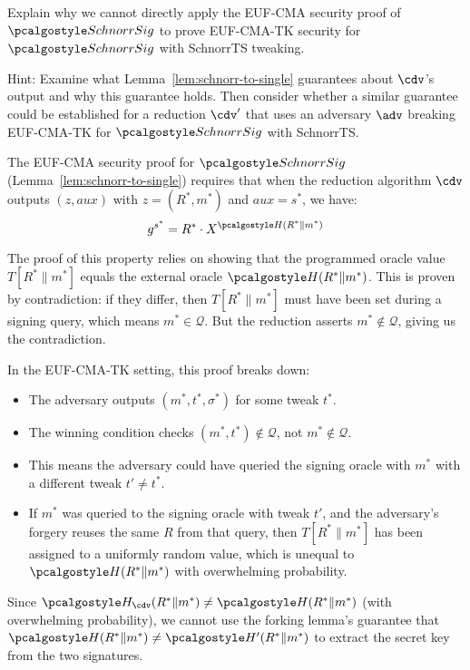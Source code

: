 \begin{exercise}
  Explain why we cannot directly apply the EUF-CMA security proof of $\algo{SchnorrSig}$ to prove EUF-CMA-TK security for $\algo{SchnorrSig}$ with SchnorrTS tweaking.
  
  Hint: Examine what Lemma~\ref{lem:schnorr-to-single} guarantees about $\cdv$'s output and why this guarantee holds. Then consider whether a similar guarantee could be established for a reduction $\cdv'$ that uses an adversary $\adv$ breaking EUF-CMA-TK for $\algo{SchnorrSig}$ with SchnorrTS.
\end{exercise}

\ifsolutions
\begin{mysolution}
  The EUF-CMA security proof for $\algo{SchnorrSig}$ (Lemma~\ref{lem:schnorr-to-single}) requires that when the reduction algorithm $\cdv$ outputs $(z, \mathit{aux})$ with $z = (R^*, m^*)$ and $\mathit{aux} = s^*$, we have:
  \[
    g^{s^*} = R^* \cdot X^{\algo{H}(R^* \| m^*)}
  \]
  
  The proof of this property relies on showing that the programmed oracle value $T[R^* \| m^*]$ equals the external oracle $\algo{H}(R^* \| m^*)$.
  This is proven by contradiction: if they differ, then $T[R^* \| m^*]$ must have been set during a signing query, which means $m^* \in \mathcal{Q}$.
  But the reduction asserts $m^* \notin \mathcal{Q}$, giving us the contradiction.
  
  In the EUF-CMA-TK setting, this proof breaks down:
  \begin{itemize}
    \item The adversary outputs $(m^*, t^*, \sigma^*)$ for some tweak $t^*$.
    \item The winning condition checks $(m^*, t^*) \notin \mathcal{Q}$, not $m^* \notin \mathcal{Q}$.
    \item This means the adversary could have queried the signing oracle with $m^*$ with a different tweak $t' \neq t^*$.
    \item If $m^*$ was queried to the signing oracle with tweak $t'$, and the adversary's forgery reuses the same $R$ from that query, then $T[R^* \| m^*]$ has been assigned to a uniformly random value, which is unequal to $\algo{H}(R^* \| m^*)$ with overwhelming probability.
  \end{itemize}
  
  Since $\algo{H}_{\cdv}(R^* \| m^*) \neq \algo{H}(R^* \| m^*)$ (with overwhelming probability), we cannot use the forking lemma's guarantee that $\algo{H}(R^* \| m^*) \neq \algo{H}'(R^* \| m^*)$ to extract the secret key from the two signatures.
\end{mysolution}
\fi

